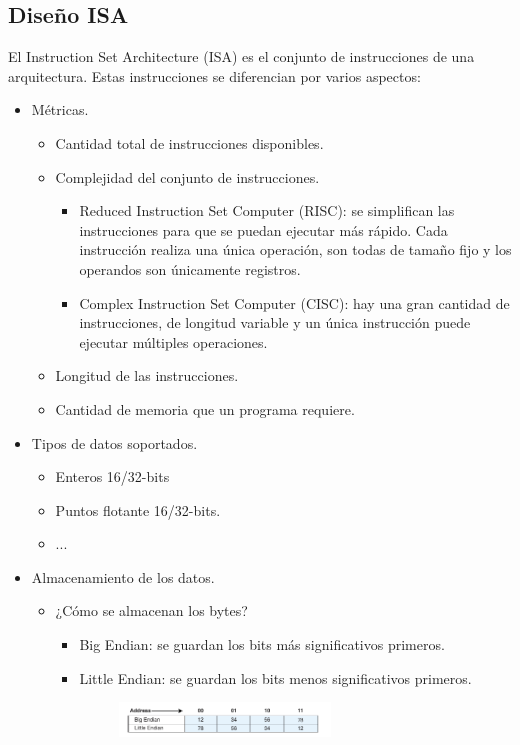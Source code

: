 \documentclass[a4paper,12pt]{article}
\begin{document}
\subsection{Diseño ISA}
El Instruction Set Architecture (ISA) es el conjunto de instrucciones de una arquitectura. Estas instrucciones se
diferencian por varios aspectos:
\begin{itemize}
  \item Métricas.
  \begin{itemize}
    \item Cantidad total de instrucciones disponibles.
    \item Complejidad del conjunto de instrucciones.
    \begin{itemize}
      \item Reduced Instruction Set Computer (RISC): se simplifican las instrucciones para que se puedan ejecutar más rápido.
      Cada instrucción realiza una única operación, son todas de tamaño fijo y los operandos son únicamente registros.
      \item Complex Instruction Set Computer (CISC): hay una gran cantidad de instrucciones, de longitud variable y un única
      instrucción puede ejecutar múltiples operaciones.
    \end{itemize}
    \item Longitud de las instrucciones.
    \item Cantidad de memoria que un programa requiere.
  \end{itemize}
  \item Tipos de datos soportados.
  \begin{itemize}
    \item Enteros 16/32-bits
    \item Puntos flotante 16/32-bits.
    \item ...
  \end{itemize}
  \item Almacenamiento de los datos.
  \begin{itemize}
    \item ¿Cómo se almacenan los bytes?
    \begin{itemize}
      \item Big Endian: se guardan los bits más significativos primeros.
      \item Little Endian: se guardan los bits menos significativos primeros.
      \begin{figure}[ht!]
        \centering
         \includegraphics[width=0.6\textwidth]{Imagenes/ENDIAN.png}

\end{figure}
\end{itemize}
\end{itemize}
\end{itemize}
\end{document}

